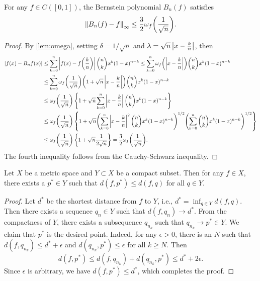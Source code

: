 \begin{theorem}
    For any $f\in C([0,1])$, the Bernstein polynomial $B_n(f)$ satisfies 
    \begin{equation*}
        \norm{B_n(f) - f}_\infty \leq \frac{3}{2}\omega_f\pth{\frac{1}{\sqrt{n}}}.
    \end{equation*}
\end{theorem}
\begin{proof}
    By \cref{lem:omega}, setting $\delta = 1/\sqrt{n}$ and 
    $\lambda = \sqrt{n}\left\lvert {x-\frac{k}{n}} \right\rvert$, then 
    \begin{equation*}
        \begin{split}
            \abs{f(x) - B_nf(x)} &\leq \sum_{k=0}^{n}\abs{f(x) - f\pth{\frac{k}{n}}}\binom{n}{k}x^k(1-x)^{n-k} 
            \leq \sum_{k=0}^{n}\omega_f\pth{\abs{x-\frac{k}{n}}}\binom{n}{k}x^k(1-x)^{n-k} \\
            &\leq \sum_{k=0}^{n}\omega_f\pth{\frac{1}{\sqrt{n}}}\pth{1 + \sqrt{n}\abs{x-\frac{k}{n}}}\binom{n}{k}x^k(1-x)^{n-k} \\
            &\leq \omega_f\pth{\frac{1}{\sqrt{n}}}\brc{1 + \sqrt{n}\sum_{k=0}^{n}\abs{x-\frac{k}{n}}\binom{n}{k}x^k(1-x)^{n-k}} \\
            &\leq \omega_f\pth{\frac{1}{\sqrt{n}}}\brc{1 + \sqrt{n}\pth{\sum_{k=0}^{n}\abs{x-\frac{k}{n}}^2\binom{n}{k}x^k(1-x)^{n-k}}^{1/2}\pth{\sum_{k=0}^{n}\binom{n}{k}x^k(1-x)^{n-k}}^{1/2}} \\
            &\leq \omega_f\pth{\frac{1}{\sqrt{n}}}\brc{1 + \sqrt{n}\frac{1}{2\sqrt{n}}}
            = \frac{3}{2}\omega_f\pth{\frac{1}{\sqrt{n}}}.
        \end{split}
    \end{equation*}
    The fourth inequality follows from the Cauchy-Schwarz inequality.
\end{proof}

\begin{theorem}\label{thm:cpt_approx}
    Let $X$ be a metric space and $Y\subset X$ be a compact subset. Then 
    for any $f\in X$, there exists a $p^*\in Y$ such that $d(f,p^*)\leq d(f,q)$ 
    for all $q\in Y$.
\end{theorem}
\begin{proof}
    Let $d^*$ be the shortest distance from $f$ to $Y$, i.e., $d^* = \inf_{q\in Y}d(f,q)$. 
    Then there exists a sequence $q_n\in Y$ such that $d(f,q_n)\to d^*$. From 
    the compactness of $Y$, there exists a subsequence $q_{n_k}$ such that
    $q_{n_k}\to p^*\in Y$. We claim that $p^*$ is the desired point. Indeed, 
    for any $\epsilon > 0$, there is an $N$ such that $d(f,q_{n_k})\leq d^* + \epsilon$ 
    and $d(q_{n_k},p^*)\leq\epsilon$ for all $k\geq N$. Then
    \begin{equation*}
        d(f,p^*) \leq d(f,q_{n_k}) + d(q_{n_k},p^*) \leq d^* + 2\epsilon.
    \end{equation*}
    Since $\epsilon$ is arbitrary, we have $d(f,p^*)\leq d^*$, 
    which completes the proof.
\end{proof}

